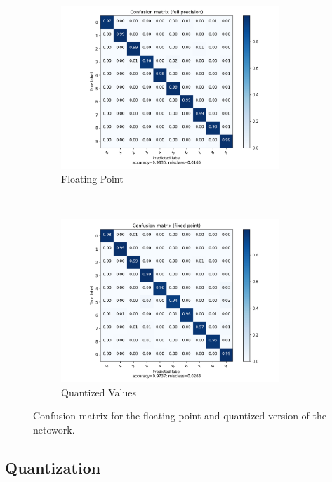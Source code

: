 \begin{figure}
\centering
\begin{subfigure}[t]{0.5\textwidth}
	\includegraphics[width=0.9\textwidth]{../../net/images/cm}
	\caption{Floating Point}
	\label{fig:network-test-cm}
\end{subfigure}%
~
\begin{subfigure}[t]{0.5\textwidth}
	\includegraphics[width=0.9\textwidth]{../../net/images/qcm}
	\caption{Quantized Values}
	\label{fig:network-test-qcm}
\end{subfigure}
\caption{Confusion matrix for the floating point and quantized version of the netowork.}
\label{fig:network-confusion-matrix}
\end{figure}


\subsection{Quantization}

